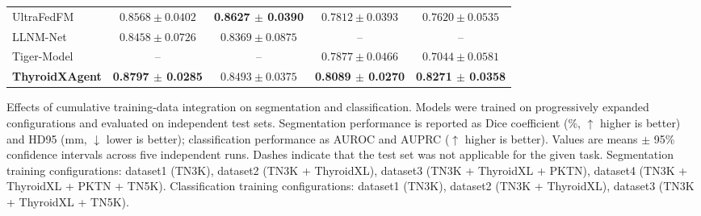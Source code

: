 \documentclass[fleqn,10pt]{wlscirep}
\begin{document}
\begin{appendices}
\begin{table}[p]
\begin{threeparttable}
\begin{tabular}{lcccc}
UltraFedFM~\cite{jiang2025pretraining}
& $0.8568 \pm 0.0402$
& \textbf{0.8627 $\pm$ 0.0390}
& $0.7812 \pm 0.0393$
& $0.7620 \pm 0.0535$\\
LLNM-Net~\cite{Shen2025NatCommunLLNM}
& $0.8458 \pm 0.0726$
& $0.8369 \pm 0.0875$
& --
& --\\
Tiger-Model~\cite{Dai2025NatCommunThyroidSubtype}
& --
& --
& $0.7877 \pm 0.0466$
& $0.7044 \pm 0.0581$\\
\rowcolor{lightgray}
\textbf{ThyroidXAgent}
& \textbf{0.8797 $\pm$ 0.0285}
& $0.8493 \pm 0.0375$
& \textbf{0.8089 $\pm$ 0.0270}
& \textbf{0.8271 $\pm$ 0.0358}\\
\bottomrule
\end{tabular}
\end{threeparttable}
\end{table}

\clearpage

\begin{table}[p]
\centering

\caption{Effects of cumulative training-data integration on segmentation and classification. Models were trained on progressively expanded configurations and evaluated on independent test sets. Segmentation performance is reported as Dice coefficient (\%, $\uparrow$ higher is better) and HD95 (mm, $\downarrow$ lower is better); classification performance as AUROC and AUPRC ($\uparrow$ higher is better). Values are means $\pm$ 95\% confidence intervals across five independent runs. Dashes indicate that the test set was not applicable for the given task. Segmentation training configurations: dataset1 (TN3K), dataset2 (TN3K + ThyroidXL), dataset3 (TN3K + ThyroidXL + PKTN), dataset4 (TN3K + ThyroidXL + PKTN + TN5K). Classification training configurations: dataset1 (TN3K), dataset2 (TN3K + ThyroidXL), dataset3 (TN3K + ThyroidXL + TN5K).}
\label{tab:stacked_performance}


\end{table}
\end{appendices}
\end{document}
